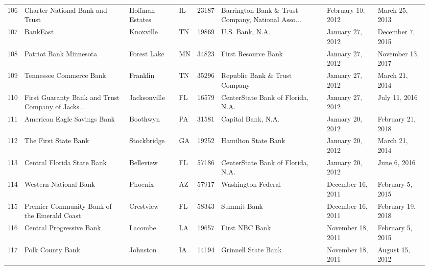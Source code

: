 \begin{tabular}{llllrlll}
106 &                    Charter National Bank and Trust &     Hoffman Estates &  IL &  23187 &  Barrington Bank \& Trust Company, National Asso... &   February 10, 2012 &      March 25, 2013 \\
107 &                                           BankEast &           Knoxville &  TN &  19869 &                                    U.S. Bank, N.A. &    January 27, 2012 &    December 7, 2015 \\
108 &                             Patriot Bank Minnesota &         Forest Lake &  MN &  34823 &                                First Resource Bank &    January 27, 2012 &   November 13, 2017 \\
109 &                            Tennessee Commerce Bank &            Franklin &  TN &  35296 &                      Republic Bank \& Trust Company &    January 27, 2012 &      March 21, 2014 \\
110 &  First Guaranty Bank and Trust Company of Jacks... &        Jacksonville &  FL &  16579 &                  CenterState Bank of Florida, N.A. &    January 27, 2012 &       July 11, 2016 \\
111 &                        American Eagle Savings Bank &            Boothwyn &  PA &  31581 &                                 Capital Bank, N.A. &    January 20, 2012 &   February 21, 2018 \\
112 &                               The First State Bank &         Stockbridge &  GA &  19252 &                                Hamilton State Bank &    January 20, 2012 &      March 21, 2014 \\
113 &                         Central Florida State Bank &           Belleview &  FL &  57186 &                  CenterState Bank of Florida, N.A. &    January 20, 2012 &        June 6, 2016 \\
114 &                              Western National Bank &             Phoenix &  AZ &  57917 &                                 Washington Federal &   December 16, 2011 &    February 5, 2015 \\
115 &        Premier Community Bank of the Emerald Coast &           Crestview &  FL &  58343 &                                        Summit Bank &   December 16, 2011 &   February 19, 2018 \\
116 &                           Central Progressive Bank &             Lacombe &  LA &  19657 &                                     First NBC Bank &   November 18, 2011 &    February 5, 2015 \\
117 &                                   Polk County Bank &            Johnston &  IA &  14194 &                                Grinnell State Bank &   November 18, 2011 &     August 15, 2012 \\

\end{tabular}

